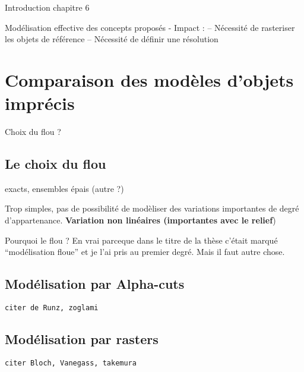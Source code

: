 %

\chaptertoc{}


Introduction chapitre 6

Modélisation effective des concepts proposés
- Impact :
-- Nécessité de rasteriser les objets de référence
-- Nécessité de définir une résolution


\section{Comparaison des modèles d'objets imprécis}

Choix du flou ?

\subsection{Le choix du flou}


exacts, ensembles épais (autre ?)

Trop simples, pas de possibilité de modèliser des variations
importantes de degré d'appartenance. \textbf{Variation non linéaires
(importantes avec le relief})



Pourquoi le flou ? En vrai parceque dans le titre de la thèse c'était
marqué ``modélisation floue'' et je l'ai pris au premier degré. Mais
il faut autre chose.


\subsection{Modélisation par Alpha-cuts}

\texttt{citer de Runz, zoglami}

\subsection{Modélisation par rasters}

\texttt{citer Bloch, Vanegass, takemura}


